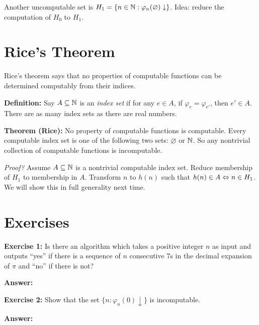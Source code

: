 Another uncomputable set is $H_1 = \{n \in \mathbb N : \varphi_n(\varnothing)\downarrow\}$.
Idea: reduce the computation of $H_0$ to $H_1$.

\section{Rice's Theorem}
Rice's theorem says that no properties of computable functions can be determined computably from their indices.

\textbf{Definition:} Say $A \subseteq \mathbb N$ is an \textit{index set} if for any $e \in A$, if $\varphi_e = \varphi_{e'}$, then $e' \in A$.
There are as many index sets as there are real numbers.

\textbf{Theorem (Rice):} No property of computable functions is computable.
Every computable index set is one of the following two sets: $\varnothing$ or $\mathbb N$.
So any nontrivial collection of computable functions is incomputable.

\textit{Proof?} Assume $A \subseteq \mathbb N$ is a nontrivial computable index set.
Reduce membership of $H_1$ to membership in $A$.
Transform $n$ to $h(n)$ such that $h(n) \in A \Leftrightarrow n \in H_1$.
We will show this in full generality next time.

\section{Exercises}

\vspace{5mm}
\noindent \textbf{Exercise 1:} 
Is there an algorithm which takes a positive integer $n$ as input and outputs ``yes'' if there is a sequence of $n$ consecutive 7s in the decimal expansion of $\pi$ and ``no'' if there is not?

\vspace{2mm}
\noindent \textbf{Answer:} 


\vspace{5mm}
\noindent \textbf{Exercise 2:} Show that the set $\{n : \varphi_n(0)\downarrow\}$ is incomputable.


\vspace{2mm}
\noindent \textbf{Answer:} 
